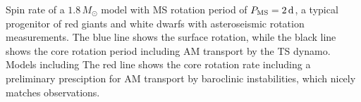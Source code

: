  \label{fig:MRI1p8rot} Spin rate of a $1.8 \, M_\odot$ model with MS rotation period of $P_{\rm MS} = 2 \, {\rm d}$, a typical progenitor of red giants and white dwarfs with asteroseismic rotation measurements. The blue line shows the surface rotation, while the black line shows the core rotation period including AM transport by the TS dynamo. Models including The red line shows the core rotation rate including a preliminary presciption for AM transport by baroclinic instabilities, which nicely matches observations.